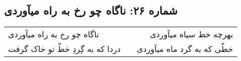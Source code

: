 \begin{center}
\section*{شماره ۲۶: ناگاه چو رخ به راه میآوردی}
\label{sec:026}
\begin{longtable}{l p{0.5cm} r}
ناگاه چو رخ به راه میآوردی
&&
بهرچه خط سیاه میآوردی
\\
دردا که به گِردِ خطّ تو خاک گرفت
&&
خطّی که به گرد ماه میآوردی
\\
\end{longtable}
\end{center}
